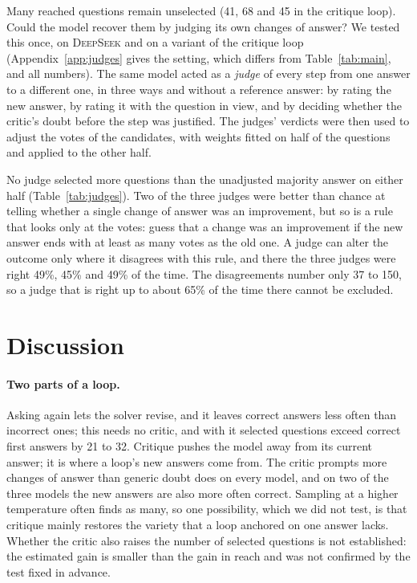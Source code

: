 \documentclass[11pt]{article}
\newcommand{\ds}{\textsc{DeepSeek}}
\begin{document}
Many reached questions remain unselected (41, 68 and 45 in the critique loop).
Could the model recover them by judging its own changes of answer?
We tested this once, on \ds{} and on a variant of the critique loop (Appendix~\ref{app:judges} gives the setting, which differs from Table~\ref{tab:main}, and all numbers).
The same model acted as a \emph{judge} of every step from one answer to a different one, in three ways and without a reference answer: by rating the new answer, by rating it with the question in view, and by deciding whether the critic's doubt before the step was justified.
The judges' verdicts were then used to adjust the votes of the candidates, with weights fitted on half of the questions and applied to the other half.

No judge selected more questions than the unadjusted majority answer on either half (Table~\ref{tab:judges}).
Two of the three judges were better than chance at telling whether a single change of answer was an improvement, but so is a rule that looks only at the votes: guess that a change was an improvement if the new answer ends with at least as many votes as the old one.
A judge can alter the outcome only where it disagrees with this rule, and there the three judges were right 49\%, 45\% and 49\% of the time.
The disagreements number only 37 to 150, so a judge that is right up to about 65\% of the time there cannot be excluded.

\section{Discussion}

\paragraph{Two parts of a loop.}
Asking again lets the solver revise, and it leaves correct answers less often than incorrect ones; this needs no critic, and with it selected questions exceed correct first answers by 21 to 32.
Critique pushes the model away from its current answer; it is where a loop's new answers come from. The critic prompts more changes of answer than generic doubt does on every model, and on two of the three models the new answers are also more often correct.
Sampling at a higher temperature often finds as many, so one possibility, which we did not test, is that critique mainly restores the variety that a loop anchored on one answer lacks.
Whether the critic also raises the number of selected questions is not established: the estimated gain is smaller than the gain in reach and was not confirmed by the test fixed in advance.
\end{document}
